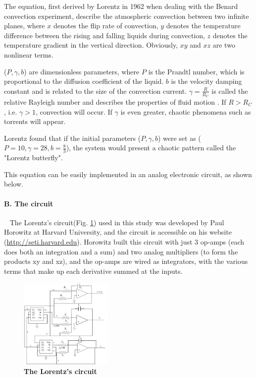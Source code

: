 \documentclass[10pt,a4paper,twocolumn,twoside,UTF8]{article}
\begin{document}
		The equation, first derived by Lorentz in 1962 when dealing with the Benard convection experiment, 
		describe the atmospheric convection between two infinite planes\autocite{lorenzDeterministicNonperiodicFlow1963}, 
		where $x$ denotes the flip rate of convection, $y$ denotes the temperature difference between the rising and falling liquids during convection, 
		$z$ denotes the temperature gradient in the vertical direction. 
		Obviously, $xy$ and $xz$ are two nonlinear terms. 
		
		($P, \gamma, b$) are dimensionless parameters, where $P$ is the Prandtl number, which is proportional to the diffusion coefficient of the liquid. 
		$b$ is the velocity damping constant and is related to the size of the convection current.
		$\gamma = \frac{R}{R_C}$ is called the relative Rayleigh number and describes the properties of fluid motion . 
		If $R > R_C$, i.e. $\gamma > 1$, convection will occur. If $\gamma$ is even greater, chaotic phenomena such as torrents will appear.

		Lorentz found that if the initial parameters ($P, \gamma, b$) were set as ($P=10, \gamma=28, b=\frac{8}{3}$),
		the system would present a chaotic pattern called the "Lorentz butterfly".

		This equation can be easily implemented in an analog electronic circuit, as shown below.

		\paragraph{B. The circuit}~
		\newline 
		\indent
		The Lorentz's circuit(Fig. \ref{fig.illus-2.1}) used in this study was developed by Paul Horowitz at Harvard University, 
		and the circuit is accessible on his website (\href{http://seti.harvard.edu/unusual_stuff/misc/lorenz.htm}{http://seti.harvard.edu}). 
		Horowitz built this circuit with just 3 op-amps (each does both an integration and a sum) and two analog multipliers (to form the products xy and xz), 
		and the op-amps are wired as integrators, with the various terms that make up each derivative summed at the inputs.
		\begin{figure}[htbp]
			\centering
			\includegraphics[width=0.4\textwidth]{attachments/fig.illus-2.1.png}
			\caption{\textbf{The Lorentz's circuit}}
			\label{fig.illus-2.1}
		\end{figure}
\end{document}
